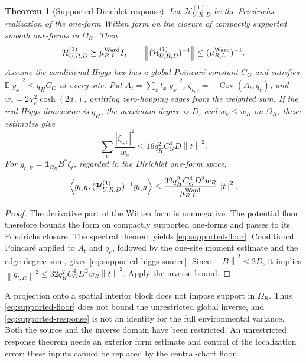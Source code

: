 \documentclass[11pt,a4paper,oneside]{book}
\theoremstyle{plain}
\newtheorem{theorem}{Theorem}[chapter]
\theoremstyle{definition}
\theoremstyle{remark}
\newcommand{\E}{\mathbb E}
\newcommand{\one}{\mathbf 1}
\newcommand{\Cov}{\operatorname{Cov}}
\newcommand{\norm}[1]{\left\lVert#1\right\rVert}
\newcommand{\pair}[2]{\left\langle#1,#2\right\rangle}
\newcommand{\src}[2]{\cite{#1}}
\begin{document}
\begin{theorem}[Supported Dirichlet response]
\label{thm:supported-response}
Let $\mathcal H^{(1)}_{U,R,D}$ be the Friedrichs realization of the
one-form Witten form on the closure of compactly supported smooth
one-forms in $\Omega_R$.  Then
\begin{equation}
 \mathcal H^{(1)}_{U,R,D}\succeq\mu_{R,L}^{\rm Ward}I,
 \qquad
 \norm{(\mathcal H^{(1)}_{U,R,D})^{-1}}
       \le(\mu_{R,L}^{\rm Ward})^{-1}.
 \label{eq:supported-floor}
\end{equation}
Assume the conditional Higgs law has a global Poincar\'e constant
$C_G$ and satisfies $\E|y_x|^2\le q_HC_G$ at every site.  Put
$A_t=\sum_x t_x|y_x|^2$,
$\zeta_{t,e}=-\Cov(A_t,q_e)$, and
$w_e=2\chi_e^2\cosh(2d_e)$, omitting zero-hopping edges from the
weighted sum.  If the real Higgs dimension is $q_H$, the
maximum degree is $D$, and $w_e\le w_R$ on $\Omega_R$, these estimates give
\begin{equation}
 \sum_e\frac{|\zeta_{t,e}|^2}{w_e}
 \le16q_H^2C_G^4D\norm{t}^2.
 \label{eq:supported-higgs-source}
\end{equation}
For $g_{t,R}=\one_{\Omega_R}B^*\zeta_t$, regarded in the Dirichlet
one-form space,
\begin{equation}
 \pair{g_{t,R}}{(\mathcal H^{(1)}_{U,R,D})^{-1}g_{t,R}}
 \le\frac{32q_H^2C_G^4D^2w_R}{\mu_{R,L}^{\rm Ward}}\norm{t}^2.
 \label{eq:supported-response}
\end{equation}
\end{theorem}
\begin{proof}
The derivative part of the Witten form is nonnegative.  The potential
floor therefore bounds the form on compactly supported one-forms and
passes to its Friedrichs closure.  The spectral theorem yields
\eqref{eq:supported-floor}.  Conditional Poincar\'e applied to
$A_t$ and $q_e$, followed by the one-site moment estimate and the
edge-degree sum, gives \eqref{eq:supported-higgs-source}.
Since $\norm{B}^2\le2D$, it implies
$\norm{g_{t,R}}^2\le32q_H^2C_G^4D^2w_R\norm{t}^2$.
Apply the inverse bound.
\end{proof}
\src{R17}{thm:v17v96-dirichlet,lem:v17v96-source,thm:v17v96-central-response}

A projection onto a spatial interior block does not impose support in
$\Omega_R$.  Thus \eqref{eq:supported-floor} does not bound the
unrestricted global inverse, and \eqref{eq:supported-response} is not an
identity for the full environmental variance.  Both the source and the
inverse domain have been restricted.  An unrestricted response theorem
needs an exterior form estimate and control of the localization error;
these inputs cannot be replaced by the central-chart floor.
\src{R17}{prop:v17v96-erratum}
\end{document}
